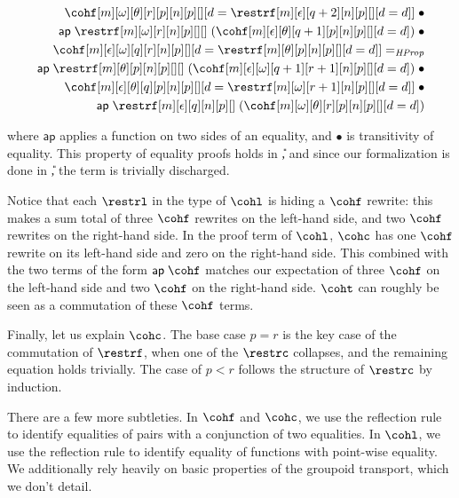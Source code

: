 \documentclass[10pt]{art.cls/art}
\renewcommand{\d}{d}
\newcommand{\ap}{\mathsf{ap}\;}
\begin{document}
\begin{align*}
  \cohf[m][\omega][\theta][r][p][n][p][][d = {\restrf[m][\epsilon][q+2][n][p][][d = \d]}]\;\bullet       \\
  \ap \restrf[m][\omega][r][n][p][][]\;(\cohf[m][\epsilon][\theta][q+1][p][n][p][][d = \d])\;\bullet     \\
  \cohf[m][\epsilon][\omega][q][r][n][p][][d = {\restrf[m][\theta][p][n][p][][d = \d]}] =_\mathit{HProp} \\
  \ap \restrf[m][\theta][p][n][p][][]\;(\cohf[m][\epsilon][\omega][q+1][r+1][n][p][][d = \d])\;\bullet   \\
  \cohf[m][\epsilon][\theta][q][p][n][p][][d = {\restrf[m][\omega][r+1][n][p][][d = \d]}]\;\bullet       \\
  \ap \restrf[m][\epsilon][q][n][p][]\;(\cohf[m][\omega][\theta][r][p][n][p][][d = \d])
\end{align*}


where $\mathsf{ap}$ applies a function on two sides of an equality, and $\bullet$ is transitivity of equality. This property of equality proofs holds in \U, and since our formalization is done in \U, the term is trivially discharged.

Notice that each $\restrl$ in the type of $\cohl$ is hiding a $\cohf$ rewrite: this makes a sum total of three $\cohf$ rewrites on the left-hand side, and two $\cohf$ rewrites on the right-hand side. In the proof term of $\cohl$, $\cohc$ has one $\cohf$ rewrite on its left-hand side and zero on the right-hand side. This combined with the two terms of the form $\ap \cohf$ matches our expectation of three $\cohf$ on the left-hand side and two $\cohf$ on the right-hand side. $\coht$ can roughly be seen as a commutation of these $\cohf$ terms.

Finally, let us explain $\cohc$. The base case $p = r$ is the key case of the commutation of $\restrf$, when one of the $\restrc$ collapses, and the remaining equation holds trivially. The case of $p < r$ follows the structure of $\restrc$ by induction.

There are a few more subtleties. In $\cohf$ and $\cohc$, we use the reflection rule to identify equalities of pairs with a conjunction of two equalities. In $\cohl$, we use the reflection rule to identify equality of functions with point-wise equality. We additionally rely heavily on basic properties of the groupoid transport, which we don't detail.
\end{document}
